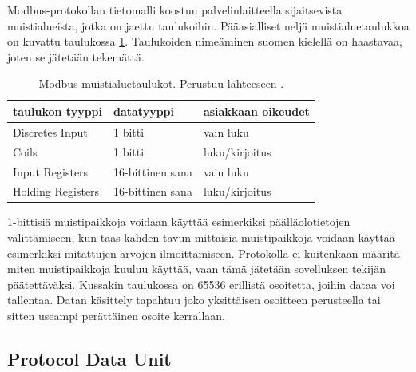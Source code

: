   Modbus-protokollan tietomalli koostuu palvelinlaitteella sijaitsevista muistialueista, jotka on jaettu taulukoihin. Pääasialliset neljä muistialuetaulukkoa on kuvattu taulukossa \ref{taulukot}. Taulukoiden nimeäminen suomen kielellä on haastavaa, joten se jätetään tekemättä.
  \begin{table}[h]
    \centering
    \caption[Modbus muistialuetaulukot.]{Modbus muistialuetaulukot. Perustuu lähteeseen \parencite{modbusAppSpec}.}
    \begin{tabular}{|l|l|l|}
      \hline
      \rowcolor{gray} taulukon tyyppi         & datatyyppi      & asiakkaan oikeudet  \\ \hline
      \cellcolor{lightgray}Discretes Input    & 1 bitti          & vain luku           \\ \hline
      \cellcolor{lightgray}Coils              & 1 bitti          & luku/kirjoitus      \\ \hline
      \cellcolor{lightgray}Input Registers    & 16-bittinen sana & vain luku           \\ \hline
      \cellcolor{lightgray}Holding Registers  & 16-bittinen sana & luku/kirjoitus      \\ \hline
    \end{tabular}
    \label{taulukot}
  \end{table}
  1-bittisiä muistipaikkoja voidaan käyttää esimerkiksi päälläolotietojen välittämiseen, kun taas kahden tavun mittaisia muistipaikkoja voidaan käyttää esimerkiksi mitattujen arvojen ilmoittamiseen. Protokolla ei kuitenkaan määritä miten muistipaikkoja kuuluu käyttää, vaan tämä jätetään sovelluksen tekijän päätettäväksi. Kussakin taulukossa on 65536 erillistä osoitetta, joihin dataa voi tallentaa. Datan käsittely tapahtuu joko yksittäisen osoitteen perusteella tai sitten useampi perättäinen osoite kerrallaan. \parencite{modbusAppSpec}

  \subsection{Protocol Data Unit}\label{sec:pdu}

